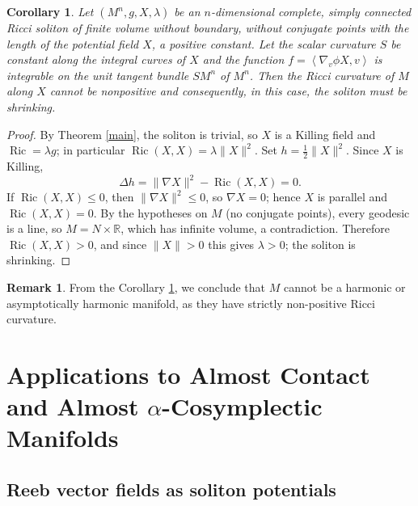 \documentclass[a4paper, twoside, 10pt]{article}
\numberwithin{equation}{section}
\newtheorem{corollary}{Corollary}[section]
\theoremstyle{definition}
\newtheorem{remark}{Remark}[section]
\begin{document}
\begin{corollary}\label{trivial}
Let $\left(M^{n},g,X,\lambda \right)$ be an $n$-dimensional complete, simply connected  
Ricci soliton of finite volume without boundary,
without conjugate points with the length of the potential field $X$, a positive constant. Let the scalar curvature $S$ be constant along the
integral curves of $X$ and the function $f=\left\langle \nabla _{v}\phi
X,v\right\rangle $ is integrable on the unit tangent bundle $SM^{n}$ of $M^{n}$. Then the Ricci curvature of $M$ along $X$ cannot be nonpositive
and consequently, in this case, the soliton must be shrinking.
\end{corollary}
\begin{proof}
By Theorem \ref{main}, the soliton is trivial, so $X$ is a Killing
field and $\operatorname{Ric}=\lambda g$; in particular
$\operatorname{Ric}(X,X)=\lambda\|X\|^2$. Set $h=\tfrac12\|X\|^2$.
Since $X$ is Killing,
\[
\Delta h = \|\nabla X\|^2 - \operatorname{Ric}(X,X)=0.
\]
If $\operatorname{Ric}(X,X)\le 0$, then $\|\nabla X\|^2\le 0$, so
$\nabla X=0$; hence $X$ is parallel and $\operatorname{Ric}(X,X)=0$.
By the hypotheses on $M$ (no conjugate points), every geodesic is a
line, so $M=N\times\mathbb{R}$, which has infinite volume, a
contradiction. Therefore $\operatorname{Ric}(X,X)>0$, and since
$\|X\|>0$ this gives $\lambda>0$; the soliton is shrinking.
\end{proof}

\bigskip
\begin{remark}
    From the Corollary \ref{trivial}, we conclude that 
$M$ cannot be a harmonic or asymptotically harmonic manifold, as they have strictly non-positive Ricci curvature.


\end{remark}

\section{Applications to Almost Contact and Almost \texorpdfstring{$\alpha$}{alpha}-Cosymplectic Manifolds}


\subsection{Reeb vector fields as soliton potentials}
\end{document}
